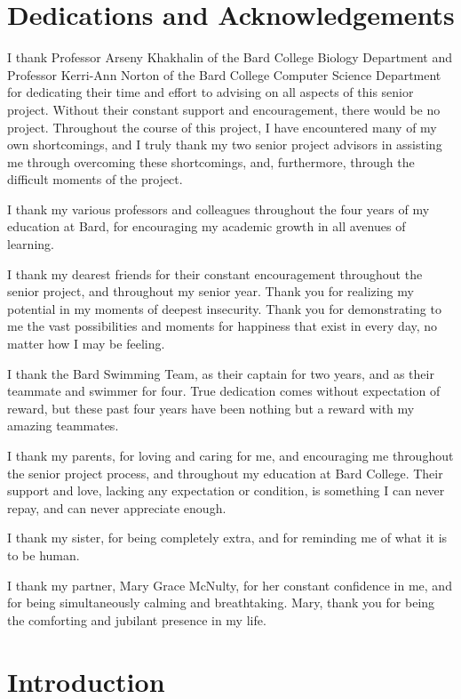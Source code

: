 \documentclass[11pt,titlepage]{article}
\begin{document}
\section*{Dedications and Acknowledgements}
I thank Professor Arseny Khakhalin of the Bard College Biology Department and Professor Kerri-Ann Norton of the Bard College Computer Science Department for dedicating their time and effort to advising on all aspects of this senior project. Without their constant support and encouragement, there would be no project. Throughout the course of this project, I have  encountered many of my own shortcomings, and I truly thank my two senior project advisors in assisting me through overcoming these shortcomings, and, furthermore, through the difficult moments of the project.\par
I thank my various professors and colleagues throughout the four years of my education at Bard, for encouraging my academic growth in all avenues of learning.\par
I thank my dearest friends for their constant encouragement throughout the senior project, and throughout my senior year. Thank you for realizing my potential in my moments of deepest insecurity. Thank you for demonstrating to me the vast possibilities and moments for happiness that exist in every day, no matter how I may be feeling.\par
I thank the Bard Swimming Team, as their captain for two years, and as their teammate and swimmer for four. True dedication comes without expectation of reward, but these past four years have been nothing but a reward with my amazing teammates.\par
I thank my parents, for loving and caring for me, and encouraging me throughout the senior project process, and throughout my education at Bard College. Their support and love, lacking any expectation or condition, is something I can never repay, and can never appreciate enough.\par
I thank my sister, for being completely extra, and for reminding me of what it is to be human.\par
I thank my partner, Mary Grace McNulty, for her constant confidence in me, and for being simultaneously calming and breathtaking. Mary, thank you for being the comforting and jubilant presence in my life.\par
\clearpage
\tableofcontents
\clearpage
\listoffigures
\clearpage
{}
\section{Introduction}
\setcounter{page}{1}
\end{document}
